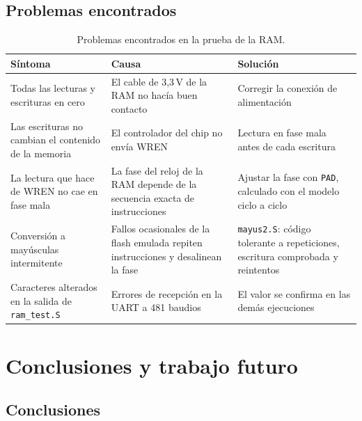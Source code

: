 \documentclass[11pt,letterpaper,oneside]{report}
\newcommand{\code}[1]{\texttt{#1}}
\begin{document}
\section{Problemas encontrados}

{\small
\begin{longtable}{>{\raggedright\arraybackslash}p{4.4cm} >{\raggedright\arraybackslash}p{5cm} >{\raggedright\arraybackslash}p{5cm}}
\caption{Problemas encontrados en la prueba de la RAM.}\label{tab:problemas_ram}\\
\toprule
\textbf{Síntoma} & \textbf{Causa} & \textbf{Solución} \\
\midrule
\endfirsthead
Todas las lecturas y escrituras en cero & El cable de 3,3\,V de la RAM no hacía buen contacto & Corregir la conexión de alimentación \\
Las escrituras no cambian el contenido de la memoria & El controlador del chip no envía WREN & Lectura en fase mala antes de cada escritura \\
La lectura que hace de WREN no cae en fase mala & La fase del reloj de la RAM depende de la secuencia exacta de instrucciones & Ajustar la fase con \code{PAD}, calculado con el modelo ciclo a ciclo \\
Conversión a mayúsculas intermitente & Fallos ocasionales de la flash emulada repiten instrucciones y desalinean la fase & \code{mayus2.S}: código tolerante a repeticiones, escritura comprobada y reintentos \\
Caracteres alterados en la salida de \code{ram\_test.S} & Errores de recepción en la UART a 481 baudios & El valor se confirma en las demás ejecuciones \\
\bottomrule
\end{longtable}
}

\chapter{Conclusiones y trabajo futuro}
\label{cap:conclusiones}

\section{Conclusiones}
\end{document}
